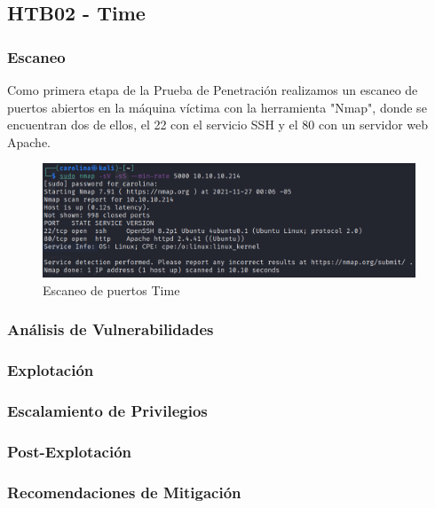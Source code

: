 \subsection{HTB02 - Time}

    \subsubsection{Escaneo}
        \large{Como primera etapa de la Prueba de Penetración realizamos un escaneo de puertos abiertos en la máquina víctima con la herramienta "Nmap", donde se encuentran dos de ellos, el 22 con el servicio SSH y el 80 con un servidor web Apache.}
        \par
        \begin{figure}[H]
            \centering
            \includegraphics[width=0.99\textwidth]{imagenes/time/01_nmap_time.png} 
            \caption{Escaneo de puertos Time} 
        \end{figure}

    \subsubsection{Análisis de Vulnerabilidades}

    \subsubsection{Explotación}

    \subsubsection{Escalamiento de Privilegios}

    \subsubsection{Post-Explotación}

    \subsubsection{Recomendaciones de Mitigación}
